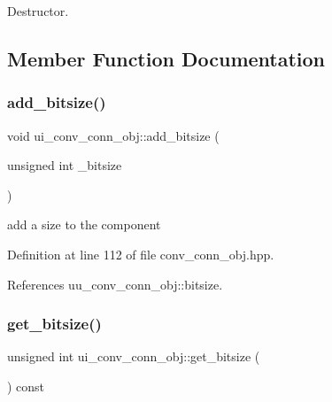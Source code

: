Destructor. 



\subsection{Member Function Documentation}
\mbox{\label{classui__conv__conn__obj_aedc4522618e6d9f52ed197bac11ceb25}} 
\subsubsection{\texorpdfstring{add\+\_\+bitsize()}{add\_bitsize()}}
{\footnotesize\ttfamily void ui\+\_\+conv\+\_\+conn\+\_\+obj\+::add\+\_\+bitsize (\begin{DoxyParamCaption}\item[{unsigned int}]{\+\_\+bitsize }\end{DoxyParamCaption})\hspace{0.3cm}{\ttfamily [inline]}}



add a size to the component 



Definition at line 112 of file conv\+\_\+conn\+\_\+obj.\+hpp.



References uu\+\_\+conv\+\_\+conn\+\_\+obj\+::bitsize.

\mbox{\label{classui__conv__conn__obj_aeebaf8338bb9b0e65c37a504f531b6f6}} 
\subsubsection{\texorpdfstring{get\+\_\+bitsize()}{get\_bitsize()}}
{\footnotesize\ttfamily unsigned int ui\+\_\+conv\+\_\+conn\+\_\+obj\+::get\+\_\+bitsize (\begin{DoxyParamCaption}{ }\end{DoxyParamCaption}) const\hspace{0.3cm}{\ttfamily [inline]}}



